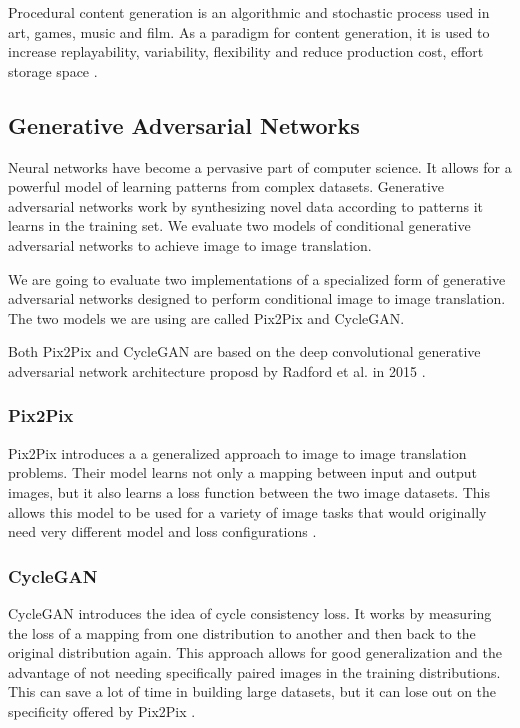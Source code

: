 \documentclass[twocolumn]{article}
\begin{document}
	Procedural content generation is an algorithmic and stochastic process used in art, games, music and film. As a paradigm for content generation, it is used to increase replayability, variability, flexibility and reduce production cost, effort storage space \cite{summerville2017procedural}.

	\subsection{Generative Adversarial Networks}
	
	Neural networks have become a pervasive part of computer science. It allows for a powerful model of learning patterns from complex datasets. Generative adversarial networks work by synthesizing novel data according to patterns it learns in the training set. We evaluate two models of conditional generative adversarial networks to achieve image to image translation.
	
	We are going to evaluate two implementations of a specialized form of generative adversarial networks designed to perform conditional image to image translation. The two models we are using are called Pix2Pix and CycleGAN.
	
	Both Pix2Pix and CycleGAN are based on the deep convolutional generative adversarial network architecture proposd by Radford et al. in 2015 \cite{radford2015unsupervised}.
	
	\subsubsection{Pix2Pix}	
	
	Pix2Pix introduces a a generalized approach to image to image translation problems.  Their model learns not only a mapping between input and output images, but it also learns a loss function between the two image datasets. This allows this model to be used for a variety of image tasks that would originally need very different model and loss configurations \cite{isola2016imagetoimage}.
	
	\subsubsection{CycleGAN}
	
	CycleGAN introduces the idea of cycle consistency loss. It works by measuring the loss of a mapping from one distribution to another and then back to the original distribution again. This approach allows for good generalization and the advantage of not needing specifically paired images in the training distributions. This can save a lot of time in building large datasets, but it can lose out on the specificity offered by Pix2Pix \cite{zhu2017unpaired}.
\end{document}
